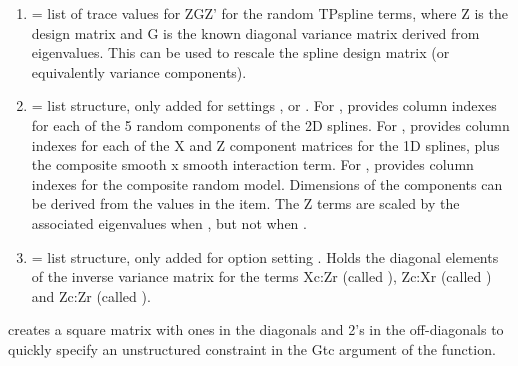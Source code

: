 \documentclass[a4paper]{book}
\begin{document}
\begin{Value}
\begin{enumerate}
\begin{enumerate}
\item{}  = order of differencing used in column dimension
\item{}  = number of random basis functions in column dimension
\item{}  = number of nested random basis functions in column dimension
used in smooth x smooth term
\item{}  = order of differencing used in column dimension
\item{}  = number of random basis functions in column dimension
\item{}  = number of nested random basis functions in column dimension
used in smooth x smooth term

\end{enumerate}

\item{}  = list of trace values for ZGZ' for the random TPspline
terms, where Z is the design matrix and G
is the known diagonal variance matrix derived from eigenvalues. This can
be used to rescale the spline design matrix (or equivalently variance
components).
\item{}  = list structure, only added for settings
,   or .
For , provides column indexes for each of the 5
random components of the 2D splines.
For , provides column indexes for each of the X and
Z component matrices for the 1D splines, plus the composite smooth x
smooth interaction term. For , provides column indexes
for the composite random model.
Dimensions of the components can be derived from the values in the
 item.  The Z terms are scaled by the associated
eigenvalues when , but not when
.
\item{}  = list structure, only added for option setting
. Holds the diagonal elements of the inverse
variance matrix for the terms Xc:Zr (called ), Zc:Xr
(called ) and Zc:Zr (called ).

\end{enumerate}

\end{Value}
%
\begin{Description}\relax
{} creates a square matrix with ones in the diagonals and 2's in the off-diagonals to quickly specify an unstructured constraint in the Gtc argument of the  function.
\end{Description}
\end{document}
